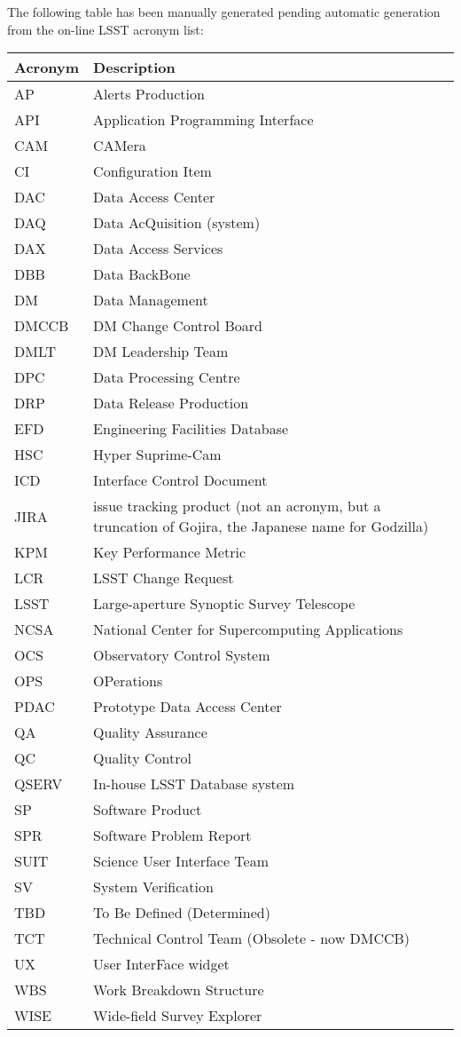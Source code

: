 The following table has been manually generated pending automatic generation from the on-line LSST acronym list:
\newline\newline%
\addtocounter{table}{-1}
\begin{longtable}{|l|p{}|}\hline 
\textbf{Acronym} & \textbf{Description}  \\\hline
AP&Alerts Production \\\hline
API&Application Programming Interface \\\hline
CAM&CAMera \\\hline
CI&Configuration Item \\\hline
DAC&Data Access Center \\\hline
DAQ&Data AcQuisition (system) \\\hline
DAX&Data Access Services \\\hline
DBB&Data BackBone \\\hline
DM&Data Management \\\hline
DMCCB&DM Change Control Board \\\hline
DMLT&DM Leadership Team \\\hline
DPC&Data Processing Centre \\\hline
DRP&Data Release Production \\\hline
EFD&Engineering Facilities Database \\\hline
HSC&Hyper Suprime-Cam \\\hline
ICD&Interface Control Document \\\hline
JIRA&issue tracking product (not an acronym, but a truncation of Gojira, the Japanese name for Godzilla) \\\hline
KPM&Key Performance Metric \\\hline
LCR&LSST Change Request \\\hline
LSST&Large-aperture Synoptic Survey Telescope \\\hline
NCSA&National Center for Supercomputing Applications \\\hline
OCS&Observatory Control System \\\hline
OPS&OPerations \\\hline
PDAC&Prototype Data Access Center \\\hline
QA&Quality Assurance \\\hline
QC&Quality Control \\\hline
QSERV&In-house LSST Database system \\\hline
SP&Software Product \\\hline
SPR&Software Problem Report \\\hline
SUIT&Science User Interface Team \\\hline
SV&System Verification \\\hline
TBD&To Be Defined (Determined) \\\hline
TCT&Technical Control Team (Obsolete - now DMCCB) \\\hline
UX&User InterFace widget \\\hline
WBS&Work Breakdown Structure \\\hline
WISE&Wide-field Survey Explorer \\\hline
\end{longtable} 
